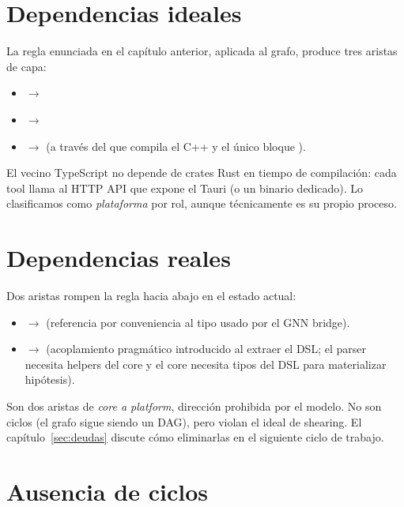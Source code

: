 \section{Dependencias ideales}

La regla enunciada en el capítulo anterior, aplicada al grafo,
produce tres aristas de capa:

\begin{itemize}
    \item {} $\to$ 
    \item {} $\to$ 
    \item {} $\to$ 
    (a través del  que compila el C++ y el único
    bloque ).
\end{itemize}

El vecino TypeScript  no depende de crates
Rust en tiempo de compilación: cada tool llama al HTTP API que
expone el Tauri (o un binario dedicado). Lo clasificamos como
\emph{plataforma} por rol, aunque técnicamente es su propio proceso.

\section{Dependencias reales}

Dos aristas rompen la regla hacia abajo en el estado actual:

\begin{itemize}
    \item {} $\to$
     (referencia por conveniencia al
    tipo  usado por el GNN bridge).
    \item {} $\to$ 
    (acoplamiento pragmático introducido al extraer el DSL; el
    parser necesita helpers del core y el core necesita tipos del
    DSL para materializar hipótesis).
\end{itemize}

Son dos aristas de \emph{core a platform}, dirección prohibida por
el modelo. No son ciclos (el grafo sigue siendo un DAG), pero
violan el ideal de shearing. El capítulo~\ref{sec:deudas} discute
cómo eliminarlas en el siguiente ciclo de trabajo.

\section{Ausencia de ciclos}

